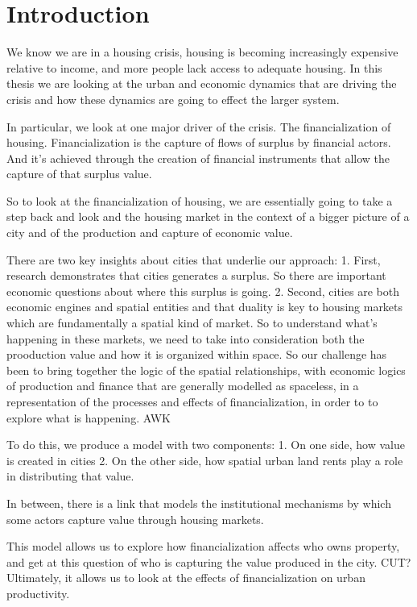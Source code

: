 \documentclass[]{article}
\begin{document}
 
\section{Introduction}
We know we are in a housing crisis, housing is becoming increasingly expensive relative to income, and more people lack access to adequate housing. In this thesis we are looking at the urban and economic dynamics that are driving the crisis and how these dynamics are going to effect the larger system.

In particular, we look at one major driver of the crisis. The financialization of housing. Financialization is the capture of flows of surplus by financial actors. And it's achieved through the creation of financial instruments that allow the capture of that surplus value. 

So to look at the financialization of housing,  we are essentially going to take a step back and look and the housing market in the context of a bigger picture of a city and of the production and capture of economic value.

There are two key insights about cities that underlie our approach: 
1. First, research demonstrates that cities generates a surplus. So there are important economic questions about where this surplus is going. 
2. Second, cities are both economic engines and spatial entities and that duality is key to housing markets which are fundamentally a spatial kind of market. So to understand what's happening in these markets, we need to take into consideration both the prooduction value and how it is organized within space. 
So our challenge has been to bring together the logic of the spatial relationships,  with economic logics of production and finance that are generally modelled as spaceless,  in a representation of the processes and effects of  financialization, in order to to explore what is happening. AWK

To do this,  we produce a model with two components:
 1. On one side, how value is created in cities 
 2. On the other side, how spatial urban land rents play a role in distributing that value. 

In between, there is a link that models the institutional mechanisms by which some actors capture value through housing markets.

This model allows us to explore how financialization affects who owns property, and get at this question of who is capturing the value produced in the city. CUT? Ultimately, it allows us to look at the effects of financialization on urban productivity.  
\end{document}
